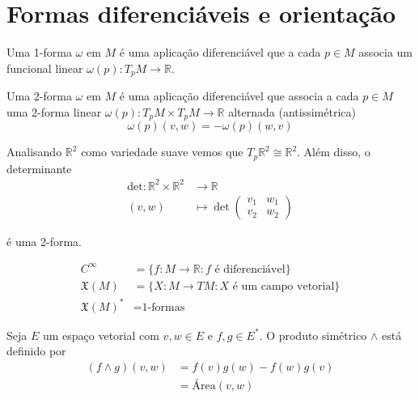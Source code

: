 \section{Formas diferenciáveis e orientação}

\begin{defi}
	Uma 1-forma $\omega$ em $M$ é uma aplicação diferenciável que a cada $p \in M$ associa um funcional linear $\omega(p): T_p M \rightarrow \mathbb{R}$.
\end{defi}

\begin{defi}
	Uma 2-forma $\omega$ em $M$ é uma aplicação diferenciável que associa a cada $p \in M$ uma 2-forma linear $\omega(p): T_p M \times T_p M \rightarrow \mathbb{R}$ alternada (antissimétrica)
	\begin{equation*}
		\omega(p) (v,w) = - \omega(p) (w,v) 
	\end{equation*}
\end{defi}

\begin{exemplo}
	Analisando $\mathbb{R}^2$ como variedade suave vemos que $T_p \mathbb{R}^2 \cong \mathbb{R}^2$. Além disso, o determinante
	\begin{align*}
		\text{det}: \mathbb{R}^2 \times \mathbb{R}^2 &\rightarrow \mathbb{R}\\
		(v,w) & \mapsto \det \left( \begin{matrix}
		v_1 & w_1\\
		v_2 & w_2
		\end{matrix} \right)
	\end{align*}
	
	é uma 2-forma.
\end{exemplo}

\begin{nota}
	\begin{align*}
		C^{\infty} &= \{ f: M \rightarrow \mathbb{R}: f \text{ é diferenciável} \}\\
		\mathfrak{X}(M) &= \{ X: M \rightarrow TM: X \text{ é um campo vetorial} \}\\
		\mathfrak{X}(M)^* &= \text{1-formas}
	\end{align*}
\end{nota}

\begin{defi}
	Seja $E$ um espaço vetorial com $v,w \in E$ e $f,g \in E^*$. O produto simétrico $\wedge$ está definido por
	\begin{align*}
		(f \wedge g) (v,w) &= f(v) g(w) - f(w) g(v)\\
		&= \text{Área}(v,w)
	\end{align*}
\end{defi}

